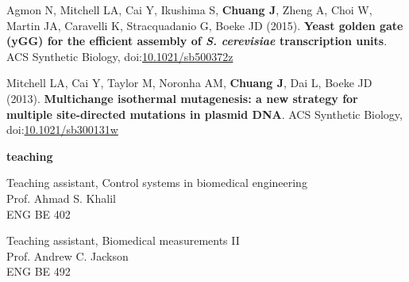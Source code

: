 \documentclass[11pt, a4paper]{article}
\begin{document}
\begin{description}[topsep=2pt, align=right, leftmargin=!, labelwidth=\widthof{\textbf{2018}}]
    \item [2015] Agmon N, Mitchell LA, Cai Y, Ikushima S, \textbf{Chuang J}, Zheng A, Choi W, Martin JA, Caravelli K, Stracquadanio G, Boeke JD (2015). \textbf{Yeast golden gate (yGG) for the efficient assembly of \textit{S. cerevisiae} transcription units}. ACS Synthetic Biology, doi:\href{https://doi.org/10.1021/sb500372z}{10.1021/sb500372z}
    \item [2013] Mitchell LA, Cai Y, Taylor M, Noronha AM, \textbf{Chuang J}, Dai L, Boeke JD (2013). \textbf{Multichange isothermal mutagenesis: a new strategy for multiple site-directed mutations in plasmid DNA}. ACS Synthetic Biology, doi:\href{https://doi.org/10.1021/sb300131w}{10.1021/sb300131w}
\end{description}

\vspace{0.8cm}
\textbf{\Large teaching}
\begin{description}[topsep=2pt, align=right, leftmargin=!, labelwidth=\widthof{\textbf{2016}}]
    \item [2016] Teaching assistant, Control systems in biomedical engineering \\ Prof. Ahmad S. Khalil \\ ENG BE 402
    \item [2015] Teaching assistant, Biomedical measurements II \\ Prof. Andrew C. Jackson \\ ENG BE 492
\end{description}
\end{document}
